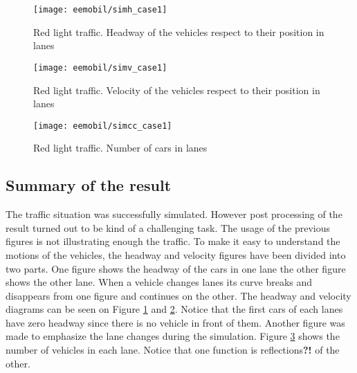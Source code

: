 		\begin{figure}
			\centering
			\texttt{[image: eemobil/simh\_case1]}
			\caption{Red light traffic. Headway of the vehicles respect to their position in lanes}
			\label{fig:red_light_situationh}
		\end{figure}
		\begin{figure}
			\centering
			\texttt{[image: eemobil/simv\_case1]}
			\caption{Red light traffic. Velocity of the vehicles respect to their position in lanes}
			\label{fig:red_light_situationv}
		\end{figure}
		\begin{figure}
			\centering
			\texttt{[image: eemobil/simcc\_case1]}
			\caption{Red light traffic. Number of cars in lanes }
			\label{fig:red_light_situationcc}
		\end{figure}
		\subsection*{Summary of the result}
		The traffic situation was successfully simulated. However post processing of the result turned out to be kind of a challenging task. The usage of the previous figures is not illustrating enough the traffic. To make it easy to understand the motions of the vehicles, the headway and velocity figures have been divided into two parts. One figure shows the headway of the cars in one lane the other figure shows the other lane. When a vehicle changes lanes its curve breaks and disappears from one figure and continues on the other. The headway and velocity diagrams can be seen on Figure \ref{fig:red_light_situationh} and \ref{fig:red_light_situationv}. Notice that the first cars of each lanes have zero headway since there is no vehicle in front of them.  Another figure was made to emphasize the lane changes during the simulation. Figure \ref{fig:red_light_situationcc} shows the number of vehicles in each lane. Notice that one function is reflections\textbf{?!} of the other.
